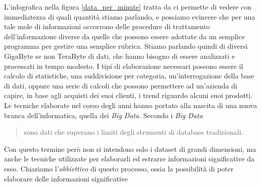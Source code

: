 L'infografica nella figura \ref{data_per_minute} tratta da \cite{data_per_minute} ci permette di vedere con immediatezza di quali quantità stiamo parlando, e possiamo evincere che per una tale mole di informazioni occorrono delle procedure di trattamento dell'informazione diverse da quelle che possono essere adottate da un semplice programma per gestire una semplice rubrica. Stiamo parlando quindi di diversi GigaByte se non TeraByte di dati, che hanno bisogno di essere analizzati e processati in tempo modesto. I tipi di elaborazione necessari possono essere il calcolo di statistiche, una suddivisione per categoria, un'interrogazione della base di dati, oppure una serie di calcoli che possono permettere ad un'azienda di capire, in base agli acquisti dei suoi clienti, i trend riguardo alcuni suoi prodotti. Le tecniche elaborate nel corso degli anni hanno portato alla nascita di una nuova branca dell'informatica, quella dei \emph{Big Data}. Secondo \cite{rezzani2013big} i \emph{Big Data}
\begin{quotation}
sono dati che superano i limiti degli strumenti di database tradizionali.
\end{quotation}
Con questo termine però non si intendono solo i dataset di grandi dimensioni, ma anche le tecniche utilizzate per elaborarli ed estrarre informazioni significative da esso.
Chiariamo l'\emph{obbiettivo} di questo processo, ossia la possibilità di poter elaborare delle informazioni significative 